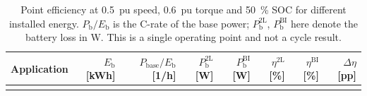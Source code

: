 \begin{table}[ht]
\centering
\caption{Point efficiency at \SI{0.5}{pu} speed, \SI{0.6}{pu} torque and \SI{50}{\percent} SOC for different installed energy. $P_\mathrm{b}/E_\mathrm{b}$ is the C-rate of the base power; $P_\mathrm{b}^\mathrm{2L}$, $P_\mathrm{b}^\mathrm{BI}$ here denote the battery loss in W. This is a single operating point and not a cycle result.}
\label{tab:energy}
\footnotesize
\begin{tabular}{@{}lrrrrrrr@{}}
\toprule
Application & $E_\mathrm{b}$ [kWh] & $P_\mathrm{base}/E_\mathrm{b}$ [1/h] & $P_\mathrm{b}^\mathrm{2L}$ [W] & $P_\mathrm{b}^\mathrm{BI}$ [W] & $\eta^\mathrm{2L}$ [\%] & $\eta^\mathrm{BI}$ [\%] & $\Delta\eta$ [pp] \\
\midrule
\\
\bottomrule
\end{tabular}
\end{table}

